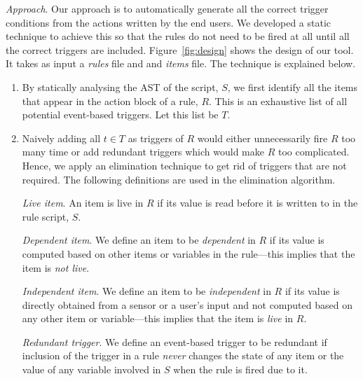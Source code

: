 \documentclass{sig-alternate-05-2015}
\begin{document}
\emph{Approach}. Our approach is to automatically generate all the correct trigger conditions from the actions written by the end users. We developed a static technique to achieve this so that the rules do not need to be fired at all until all the correct triggers are included. Figure~\ref{fig:design} shows the design of our tool. It takes as input a \textit{rules} file and and \textit{items} file. The technique is explained below.
\begin{enumerate}
\item By statically analysing the AST of the script, $S$, we first identify all the items that appear in the action block of a rule, $R$. This is an exhaustive list of all potential event-based triggers. Let this list be $T$.
\item Naively adding all $t \in T$ as triggers of $R$ would either unnecessarily fire $R$ too many time or add redundant triggers which would make $R$ too complicated. Hence, we apply an elimination technique to get rid of triggers that are not required. The following definitions are used in the elimination algorithm. 

\emph{Live item}. An item is live in $R$ if its value is read before it is written to in the rule script, $S$. 

\emph{Dependent item}. We define an item to be \emph{dependent} in $R$ if its value is computed based on other items or variables in the rule---this implies that the item is \emph{not live}. 
 
\emph{Independent item}. We define an item to be \emph{independent} in $R$ if  its value is directly obtained from a sensor or a user's input and not computed based on any other item or variable---this implies that the item is \emph{live} in $R$. 

\emph{Redundant trigger}. We define an event-based trigger to be redundant if inclusion of the trigger in a rule \emph{never} changes the state of any item or the value of any variable involved in $S$ when the rule is fired due to it.


\end{enumerate}
\end{document}
